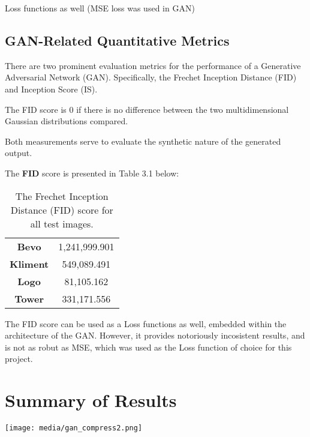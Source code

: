 Loss functions as well (MSE loss was used in GAN)


\subsection{GAN-Related Quantitative Metrics}

There are two prominent evaluation metrics for the performance of a Generative Adversarial Network (GAN).
Specifically, the Frechet Inception Distance (FID) and Inception Score (IS).

The FID score is 0 if there is no difference between the two multidimensional Gaussian distributions compared. 

Both measurements serve to evaluate the synthetic nature of the generated output. 


The \textbf{FID} score is presented in Table 3.1 below:

\begin{table}[H]
    \begin{center}
    \begin{tabular}{|c|c|}
        \hline
    \textbf{Bevo}	& 1,241,999.901 \\
    \textbf{Kliment}	& 549,089.491\\
    \textbf{Logo}	& 81,105.162\\
    \textbf{Tower} & 331,171.556\\\hline
    
    \end{tabular}
    \caption[FID Score]{The Frechet Inception Distance (FID) score for all test images.}
    \end{center}
    \end{table}


The FID score can be used as a Loss functions as well, embedded within the architecture of the GAN.
However, it provides notoriously incosistent results, and is not as robut as MSE, which was used as 
the Loss function of choice for this project.

\section{Summary of Results}

\begin{center}
	\texttt{[image: media/gan\_compress2.png]}
\end{center}

